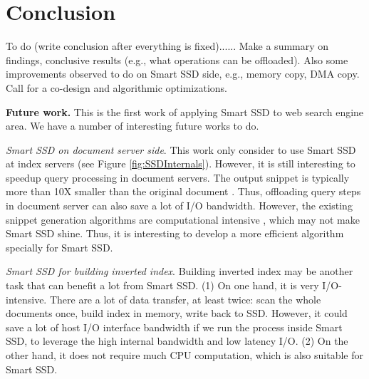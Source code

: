 \section{Conclusion}\label{sec:conclusion}

To do (write conclusion after everything is fixed)...... Make a summary on findings, conclusive results (e.g., what operations can be offloaded). Also some improvements observed to do on Smart SSD side, e.g., memory copy, DMA copy. Call for a co-design and algorithmic optimizations.

\textbf{Future work.}
This is the first work of applying Smart SSD to web search engine area. We have a number of interesting future works to do.

\emph{Smart SSD on document server side}. This work only consider to use Smart SSD at index servers (see Figure \ref{fig:SSDInternals}). However, it is still interesting to speedup query processing in document servers. The output snippet is typically more than 10X smaller than the original document \cite{Markatos01,Turpin2007FGR}. Thus, offloading query steps in document server can also save a lot of I/O bandwidth. However, the existing snippet generation algorithms are computational intensive \cite{Wang2013ISS}, which may not make Smart SSD shine. Thus, it is interesting to develop a more efficient algorithm specially for Smart SSD.

\emph{Smart SSD for building inverted index}. Building inverted index may be another task that can benefit a lot from Smart SSD. (1) On one hand, it is very I/O-intensive.
  There are a lot of data transfer, at least twice: scan the whole documents once, build index in memory, write back to SSD. However, it could save a lot of host I/O interface bandwidth if we run the process inside Smart SSD, to leverage the high internal bandwidth and low latency I/O. (2) On the other hand, it does not require much CPU computation, which is also suitable for Smart SSD.
